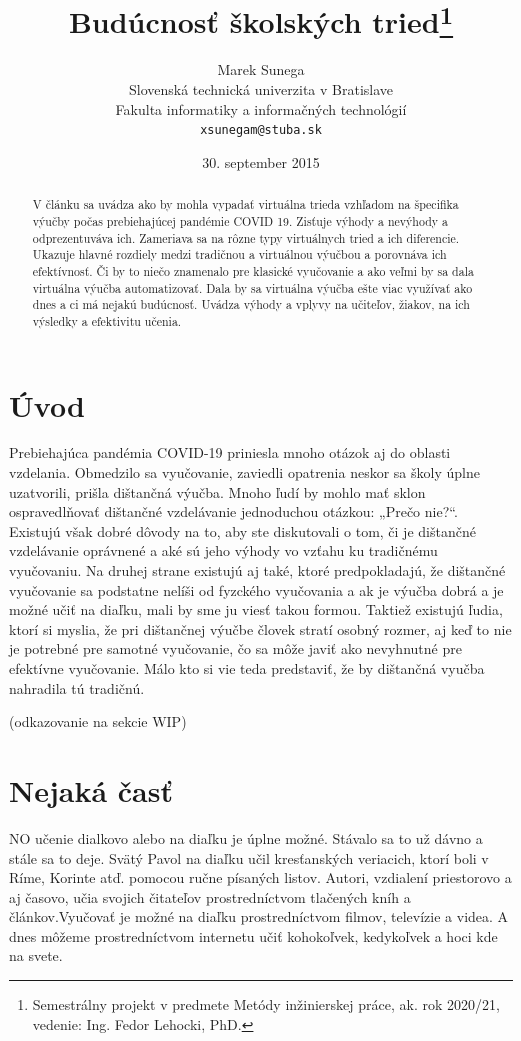 \documentclass[10pt,twoside,slovak,a4paper]{article}
\title{Budúcnosť školských tried\thanks{Semestrálny projekt v predmete Metódy inžinierskej práce, ak. rok 2020/21, vedenie: Ing. Fedor Lehocki, PhD.}} %
\author{Marek Sunega\\[2pt]
	{\small Slovenská technická univerzita v Bratislave}\\
	{\small Fakulta informatiky a informačných technológií}\\
	{\small \texttt{xsunegam@stuba.sk}}
	}
\date{\small 30. september 2015} %
\begin{document}
\maketitle

\begin{abstract}
    V článku sa uvádza ako by mohla vypadať virtuálna trieda vzhľadom na špecifika výučby počas 
	prebiehajúcej pandémie COVID 19. Zisťuje výhody a nevýhody a odprezentuváva ich. Zameriava 
	sa na rôzne typy virtuálnych tried a ich diferencie. Ukazuje hlavné rozdiely medzi tradičnou 
	a virtuálnou výučbou a porovnáva ich efektívnosť. Či by to niečo znamenalo pre klasické vyučovanie 
	a ako veľmi by sa dala virtuálna výučba automatizovať. Dala by sa virtuálna výučba ešte viac 
	využívať ako dnes a ci má nejakú budúcnosť. Uvádza výhody a vplyvy na učiteľov, žiakov, na ich 
	výsledky a efektivitu učenia.
\end{abstract}



\section{Úvod}
Prebiehajúca pandémia COVID-19 priniesla mnoho otázok aj do oblasti vzdelania. Obmedzilo sa vyučovanie, zaviedli 
opatrenia neskor sa školy úplne uzatvorili, prišla dištančná výučba.
Mnoho ľudí by mohlo mať sklon ospravedlňovať dištančné vzdelávanie jednoduchou otázkou: „Prečo nie?“.\cite{ency}
Existujú však dobré dôvody na to, aby ste diskutovali o tom, či je dištančné vzdelávanie oprávnené a aké sú 
jeho výhody vo vzťahu ku tradičnému vyučovaniu. Na druhej strane existujú aj také, 
ktoré predpokladajú, že dištančné vyučovanie sa podstatne nelíši od fyzckého vyučovania a ak je výučba dobrá a 
je možné učiť na diaľku, mali by sme ju viesť takou formou. Taktiež existujú ľudia, ktorí si myslia, že pri dištančnej výučbe 
človek stratí osobný rozmer, aj keď to nie je potrebné pre samotné vyučovanie, čo sa môže  javiť ako nevyhnutné pre 
efektívne vyučovanie. Málo kto si vie teda predstaviť, že by dištančná vyučba nahradila tú tradičnú. 

(odkazovanie na sekcie WIP)

\section{Nejaká časť} \label{nejaka}

NO učenie dialkovo alebo na diaľku je úplne možné.\cite{ency} Stávalo sa to už dávno a stále sa to deje. Svätý Pavol na diaľku učil kresťanských veriacich,
ktorí boli v Ríme, Korinte atď. pomocou ručne písaných listov. Autori, vzdialení priestorovo a aj časovo, učia svojich 
čitateľov prostredníctvom tlačených kníh a článkov.Vyučovať je možné na diaľku prostredníctvom 
filmov, televízie a videa. A dnes môžeme prostredníctvom internetu učiť kohokoľvek, kedykoľvek a hoci kde na svete.
\end{document}
